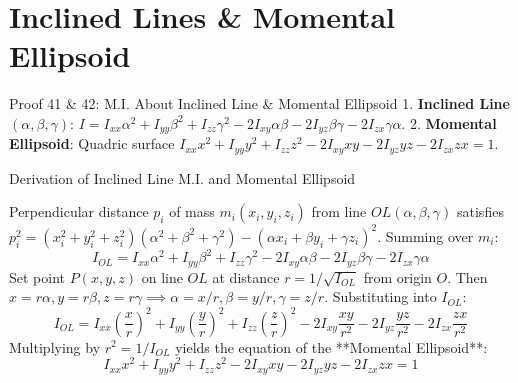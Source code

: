 \documentclass[11pt, a4paper]{report}
\begin{document}
\section{Inclined Lines \& Momental Ellipsoid}

\begin{theorembox}{Proof 41 \& 42: M.I. About Inclined Line \& Momental Ellipsoid}
1. \textbf{Inclined Line $(\alpha, \beta, \gamma)$}: $I = I_{xx}\alpha^2 + I_{yy}\beta^2 + I_{zz}\gamma^2 - 2I_{xy}\alpha\beta - 2I_{yz}\beta\gamma - 2I_{zx}\gamma\alpha$.
2. \textbf{Momental Ellipsoid}: Quadric surface $I_{xx}x^2 + I_{yy}y^2 + I_{zz}z^2 - 2I_{xy}xy - 2I_{yz}yz - 2I_{zx}zx = 1$.
\end{theorembox}

\begin{proofbox}{Derivation of Inclined Line M.I. and Momental Ellipsoid}
\begin{center}
\end{center}

Perpendicular distance $p_i$ of mass $m_i(x_i, y_i, z_i)$ from line $OL(\alpha,\beta,\gamma)$ satisfies $p_i^2 = (x_i^2+y_i^2+z_i^2)(\alpha^2+\beta^2+\gamma^2) - (\alpha x_i + \beta y_i + \gamma z_i)^2$. Summing over $m_i$:
\[
I_{OL} = I_{xx}\alpha^2 + I_{yy}\beta^2 + I_{zz}\gamma^2 - 2I_{xy}\alpha\beta - 2I_{yz}\beta\gamma - 2I_{zx}\gamma\alpha
\]
Set point $P(x,y,z)$ on line $OL$ at distance $r = 1/\sqrt{I_{OL}}$ from origin $O$. Then $x = r\alpha, y = r\beta, z = r\gamma \implies \alpha = x/r, \beta = y/r, \gamma = z/r$. Substituting into $I_{OL}$:
\[
I_{OL} = I_{xx}\left(\frac{x}{r}\right)^2 + I_{yy}\left(\frac{y}{r}\right)^2 + I_{zz}\left(\frac{z}{r}\right)^2 - 2I_{xy}\frac{xy}{r^2} - 2I_{yz}\frac{yz}{r^2} - 2I_{zx}\frac{zx}{r^2}
\]
Multiplying by $r^2 = 1/I_{OL}$ yields the equation of the **Momental Ellipsoid**:
\[
I_{xx}x^2 + I_{yy}y^2 + I_{zz}z^2 - 2I_{xy}xy - 2I_{yz}yz - 2I_{zx}zx = 1
\]
\end{proofbox}
\end{document}
